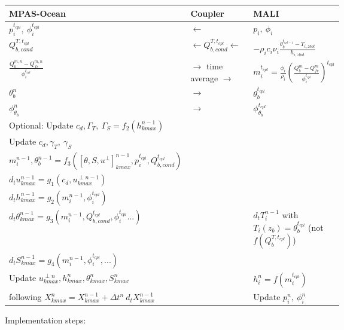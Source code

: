 \documentclass[11pt]{report}
\begin{document}
\begin{tabularx}{\linewidth}{p{0.45\linewidth}|p{0.2\linewidth}|X}
    MPAS-Ocean & Coupler & MALI\\
    \hline
    $p_i^{t_{cpl}},\:\phi_i^{t_{cpl}}$ & $\leftarrow$ & $p_i,\:\phi_i$\\
    $Q_{b,cond}^{T,t_{cpl}}$ & $\leftarrow Q_{b,cond}^{T,t_{cpl}} \leftarrow$ & $-\rho_i c_i \nu_i \frac{\theta_b^{t_{cpl - 1}} - T_{i,zbot}}{h_{i,zbot}}$\\
    \hline
    $\frac{Q_b^{m,n} - Q_{fr}^{m,n}}{\phi_i^{t_{cpl}}}$ & $\rightarrow$ time average $\rightarrow$ & $m_i^{t_{cpl}} = \frac{\phi_i}{\rho_i}\left(\frac{Q_b^{m} - Q_{fr}^{m}}{\phi_i^{t_{cpl}}}\right)^{t_{cpl}}$\\
    $\theta_b^{n}$ & $\rightarrow$ & $\theta_b^{t_{cpl}}$\\
    $\phi_{\theta_b}^{n}$ & $\rightarrow$ & $\phi_{\theta_b}^{t_{cpl}}$\\
    \hline
    Optional: Update $c_d,\Gamma_T,\:\Gamma_S = f_2(h_{kmax}^{n-1})$&&\\
    Update $c_d,\gamma_T,\:\gamma_S$&&\\
    $m_i^{n-1},\theta_b^{n-1} = f_3([\theta, S, u^\perp]_{kmax}^{n-1}, p_i^{t_{cpl}},Q_{b,cond}^{t_{cpl}})$&&\\
    \hline
    $d_t u_{kmax}^{n-1} = g_1(c_d, u_{kmax}^{\perp n-1})$&&\\
    $d_t h_{kmax}^{n-1} = g_2(m_i^{n-1}, \phi_i^{t_{cpl}})$&&\\
    $d_t \theta_{kmax}^{n-1} = g_3(m_i^{n-1}, Q_{b,cond}^{t_{cpl}}, \phi_i^{t_{cpl}}...)$
    && $d_t T_i^{n-1}$ with $T_i(z_b) = \theta_b^{t_{cpl}}$ (not $f(Q_b^{T,t_{cpl}})$)\\
    $d_t S_{kmax}^{n-1} = g_4(m_i^{n-1}, \phi_i^{t_{cpl}}, ...)$&&\\
    \hline
    Update $u_{kmax}^{\perp n},h_{kmax}^n,\theta_{kmax}^n, S_{kmax}^n$ && $h_i^n = f(m_i^{t_{cpl}})$\\
    following $X_{kmax}^n = X_{kmax}^{n-1} + \Delta t^n \:d_t X_{kmax}^{n-1}$
    && Update $p_i^n,\:\phi_i^n$\\
    \hline
\end{tabularx}
\newpage
Implementation steps:
\end{document}
